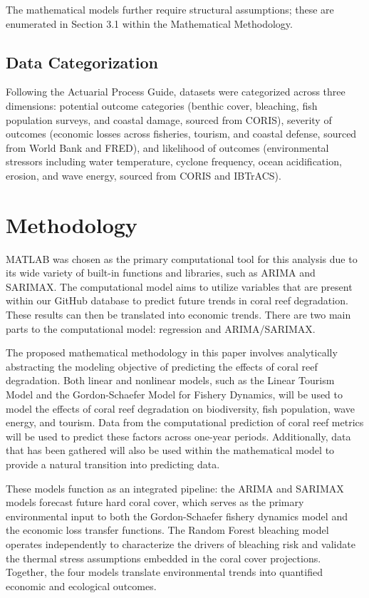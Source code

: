 \documentclass[10pt,letterpaper]{article}
\newcounter{assumption}
\newcounter{metric}
\begin{document}
The mathematical models further require structural assumptions; these are enumerated in Section 3.1 within the Mathematical Methodology.

\subsection{Data Categorization}

Following the Actuarial Process Guide, datasets were categorized across three dimensions: potential outcome categories (benthic cover, bleaching, fish population surveys, and coastal damage, sourced from CORIS), severity of outcomes (economic losses across fisheries, tourism, and coastal defense, sourced from World Bank and FRED), and likelihood of outcomes (environmental stressors including water temperature, cyclone frequency, ocean acidification, erosion, and wave energy, sourced from CORIS and IBTrACS).

\section{Methodology}

MATLAB was chosen as the primary computational tool for this analysis due to its wide variety of built-in functions and libraries, such as ARIMA and  SARIMAX. The computational model aims to utilize variables that are present within our GitHub database to predict future trends in coral reef degradation. These results can then be translated into economic trends. There are two main parts to the computational model: regression and ARIMA/SARIMAX.

The proposed mathematical methodology in this paper involves analytically abstracting the modeling objective of predicting the effects of coral reef degradation. Both linear and nonlinear models, such as the Linear Tourism Model and the Gordon-Schaefer Model for Fishery Dynamics, will be used to model the effects of coral reef degradation on biodiversity, fish population, wave energy, and tourism. Data from the computational prediction of coral reef metrics will be used to predict these factors across one-year periods. Additionally, data that has been gathered will also be used within the mathematical model to provide a natural transition into predicting data.

These models function as an integrated pipeline: the ARIMA and SARIMAX models forecast future hard coral cover, which serves as the primary environmental input to both the Gordon-Schaefer fishery dynamics model and the economic loss transfer functions. The Random Forest bleaching model operates independently to characterize the drivers of bleaching risk and validate the thermal stress assumptions embedded in the coral cover projections. Together, the four models translate environmental trends into quantified economic and ecological outcomes.
\end{document}
